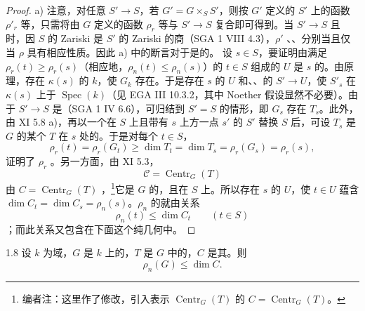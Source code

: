 \begin{proof}
a) 注意，对任意 $S'\to S$，若 $G'=G\times_S S'$，则按 $G'$ 定义的 $S'$ 上的函数 $\rho'_r$ 等，只需将由 $G$ 定义的函数 $\rho_r$ 等与 $S'\to S$ 复合即可得到。当 $S'\to S$ 且时，因 $S$ 的 Zariski 是 $S'$ 的 Zariski 的商（SGA 1 VIII 4.3），$\rho'$ 、、分别当且仅当 $\rho$ 具有相应性质。因此 a) 中的断言对于是的。
设 $s\in S$，要证明由满足 $\rho_r(t)\geq\rho_r(s)$（相应地，$\rho_n(t)\leq\rho_n(s)$）的 $t\in S$ 组成的 $U$ 是 $s$ 的。由原理，存在 $\kappa(s)$ 的 $k$，使 $G_k$ 存在。于是存在 $s$ 的 $U$ 和、、的 $S'\to U$，使 $S'_s$ 在 $\kappa(s)$ 上于 $\operatorname{Spec}(k)$（见 EGA III 10.3.2，其中 Noether 假设显然不必要）。由于 $S'\to S$ 是（SGA 1 IV 6.6），可归结到 $S'=S$ 的情形，即 $G_s$ 存在 $T_s$。此外，由 XI 5.8 a)，再以一个在 $S$ 上且带有 $s$ 上方一点 $s'$ 的 $S'$ 替换 $S$ 后，可设 $T_s$ 是 $G$ 的某个 $T$ 在 $s$ 处的。于是对每个 $t\in S$，
\[\rho_r(t)=\rho_r(G_t)\geq\dim T_t=\dim T_s=\rho_r(G_s)=\rho_r(s),\]
证明了 $\rho_r$ 。另一方面，由 XI 5.3，
\[\mathcal C=\operatorname{Centr}_G(T)\]
由 $C=\operatorname{Centr}_G(T)$ ，\footnote[2]{编者注：这里作了修改，引入表示 $\operatorname{Centr}_G(T)$ 的 $C=\operatorname{Centr}_G(T)$。}它是 $G$ 的，且在 $S$ 上。所以存在 $s$ 的 $U$，使 $t\in U$ 蕴含 $\dim C_t=\dim C_s=\rho_n(s)$。$\rho_n$ 的就由关系
\[\rho_n(t)\leq\dim C_t\qquad(t\in S)\]
；而此关系又包含在下面这个纯几何中。
\end{proof}
\begin{SGAresult}{}{1.8}
设 $k$ 为域，$G$ 是 $k$ 上的，$T$ 是 $G$ 中的，$C$ 是其。则
\[\rho_n(G)\leq\dim C.\]
\end{SGAresult}
